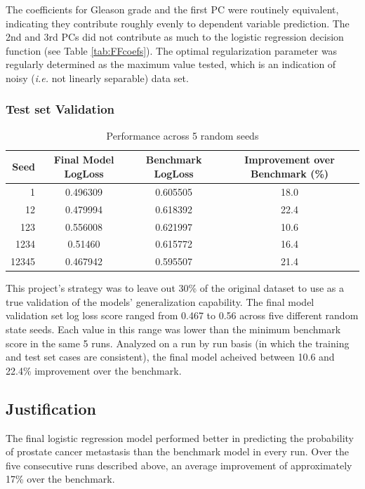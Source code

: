 \documentclass[final]{article}
\begin{document}
The coefficients for Gleason grade and the first PC were routinely equivalent,
indicating they contribute roughly evenly to dependent variable prediction.  The
2nd and 3rd PCs did not contribute as much to the logistic regression decision
function (see Table \ref{tab:FFcoefs}).  The optimal regularization parameter
was regularly determined as the maximum value tested, which is an indication of
noisy (\textit{i.e.} not linearly separable) data set.


\subsubsection{Test set Validation}

\begin{table}[h]
\centering
\caption{Performance across 5 random seeds\label{tab:performance}}
\begin{tabular}[h]{ r c c c }
\hline
Seed & Final Model LogLoss & Benchmark LogLoss & Improvement over Benchmark (\%) \\  \hline
1 & 0.496309 & 0.605505 & 18.0 \\
12 & 0.479994 & 0.618392 & 22.4 \\
123 & 0.556008 & 0.621997 & 10.6 \\
1234 & 0.51460 & 0.615772 & 16.4 \\
12345 & 0.467942 & 0.595507 & 21.4 \\
\hline
\end{tabular}
\end{table}

This project's strategy was to leave out 30\% of the original dataset to use as a
true validation of the models' generalization capability.  The final model validation
set log loss score ranged from 0.467 to 0.56 across five different random state
seeds.  Each value in this range was lower than the minimum benchmark score in the
same 5 runs.  Analyzed on a run by run basis (in which the training and test set cases
are consistent), the final model acheived between 10.6 and 22.4\% improvement over
the benchmark.

\subsection{Justification}

The final logistic regression model performed better in predicting the
probability of prostate cancer  metastasis than the benchmark model in every
run.  Over the five consecutive runs described above, an average improvement of
approximately 17\%  over the benchmark.
\end{document}
